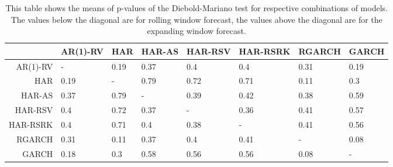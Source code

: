 \begin{table}[ht]
\centering
\begin{tabular}{rlllllll}
  \hline
 & AR(1)-RV & HAR & HAR-AS & HAR-RSV & HAR-RSRK & RGARCH & GARCH \\ 
  \hline
AR(1)-RV & - & 0.19 & 0.37 & 0.4 & 0.4 & 0.31 & 0.19 \\ 
  HAR & 0.19 & - & 0.79 & 0.72 & 0.71 & 0.11 & 0.3 \\ 
  HAR-AS & 0.37 & 0.79 & - & 0.39 & 0.42 & 0.38 & 0.59 \\ 
  HAR-RSV & 0.4 & 0.72 & 0.37 & - & 0.36 & 0.41 & 0.57 \\ 
  HAR-RSRK & 0.4 & 0.71 & 0.4 & 0.38 & - & 0.41 & 0.56 \\ 
  RGARCH & 0.31 & 0.11 & 0.37 & 0.4 & 0.41 & - & 0.08 \\ 
  GARCH & 0.18 & 0.3 & 0.58 & 0.56 & 0.56 & 0.08 & - \\ 
   \hline
\end{tabular}
\caption[DM test means]{This table shows the means of p-values of the Diebold-Mariano test for respective combinations of models.
                The values below the diagonal are for rolling window forecast, the values above the diagonal are for the expanding window forecast.} 
\label{Table:DM_test_mean}
\end{table}
